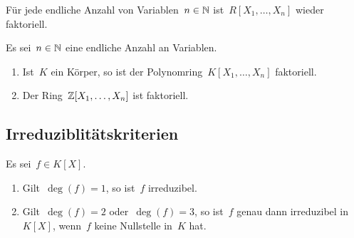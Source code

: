 \begin{corollary}
  \label{polynomial rings in multiple variables are ufd}
  Für jede endliche Anzahl von Variablen~$n \in \mathbb{N}$ ist~$R[X_1, \dotsc, X_n]$ wieder faktoriell.
\end{corollary}

\begin{example}
  Es sei~$n \in \mathbb{N}$ eine endliche Anzahl an Variablen.
  \leavevmode
  \begin{enumerate}
    \item
      Ist~$K$ ein Körper, so ist der Polynomring~$K[X_1, \dotsc, X_n]$ faktoriell.
    \item
      Der Ring~$\mathbb{Z}[X_1, \dotsc, X_n]$ ist faktoriell.
  \end{enumerate}
\end{example}



\subsection{Irreduziblitätskriterien}

\begin{proposition}
  Es sei~$f \in K[X]$.
  \begin{enumerate}
    \item
      Gilt~$\deg(f) = 1$, so ist~$f$ irreduzibel.
    \item
      Gilt~$\deg(f) = 2$ oder~$\deg(f) = 3$, so ist~$f$ genau dann irreduzibel in~$K[X]$, wenn~$f$ keine Nullstelle in~$K$ hat.
  \end{enumerate}
\end{proposition}

